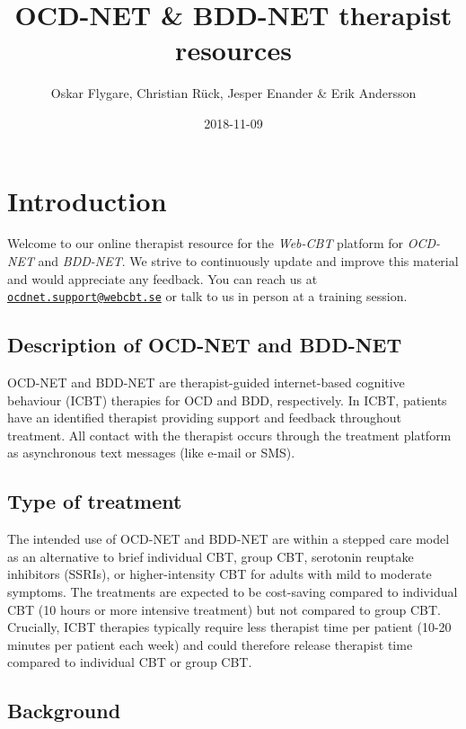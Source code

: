 \documentclass[]{book}
\title{OCD-NET \& BDD-NET therapist resources}
\author{Oskar Flygare, Christian Rück, Jesper Enander \& Erik Andersson}
\date{2018-11-09}
\theoremstyle{definition}
\theoremstyle{definition}
\theoremstyle{definition}
\theoremstyle{remark}
\begin{document}
\maketitle

{
\setcounter{tocdepth}{1}
\tableofcontents
}
\hypertarget{introduction}{%
\chapter{Introduction}\label{introduction}}

Welcome to our online therapist resource for the \emph{Web-CBT} platform
for \emph{OCD-NET} and \emph{BDD-NET}. We strive to continuously update
and improve this material and would appreciate any feedback. You can
reach us at
\href{mailto:ocdnet.support@webcbt.se}{\nolinkurl{ocdnet.support@webcbt.se}}
or talk to us in person at a training session.

\hypertarget{description-of-ocd-net-and-bdd-net}{%
\section{Description of OCD-NET and
BDD-NET}\label{description-of-ocd-net-and-bdd-net}}

OCD-NET and BDD-NET are therapist-guided internet-based cognitive
behaviour (ICBT) therapies for OCD and BDD, respectively. In ICBT,
patients have an identified therapist providing support and feedback
throughout treatment. All contact with the therapist occurs through the
treatment platform as asynchronous text messages (like e-mail or SMS).

\hypertarget{type-of-treatment}{%
\section{Type of treatment}\label{type-of-treatment}}

The intended use of OCD-NET and BDD-NET are within a stepped care model
as an alternative to brief individual CBT, group CBT, serotonin reuptake
inhibitors (SSRIs), or higher-intensity CBT for adults with mild to
moderate symptoms. The treatments are expected to be cost-saving
compared to individual CBT (10 hours or more intensive treatment) but
not compared to group CBT. Crucially, ICBT therapies typically require
less therapist time per patient (10-20 minutes per patient each week)
and could therefore release therapist time compared to individual CBT or
group CBT.

\hypertarget{background}{%
\section{Background}\label{background}}
\end{document}

